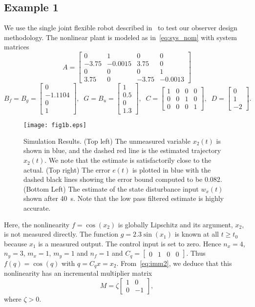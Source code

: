 \documentclass[times, doublespace]{rncauth}
\begin{document}
\subsection{Example 1}
We use the single joint flexible robot described in~\cite{Zhu2014} to test our observer design methodology. The nonlinear plant is modeled as in~\eqref{eq:sys_nom} with system matrices
\[
A = \begin{bmatrix}
0 & 1 & 0 & 0\\
-3.75 & -0.0015 & 3.75 & 0\\
0 & 0 & 0 & 1\\
3.75 & 0 & -3.75 & -0.0013
\end{bmatrix}\]
\begin{equation*} B_f = B_g = \begin{bmatrix}
0 \\ -1.1104 \\ 0 \\ 1
\end{bmatrix}, \;\; G = B_u = \begin{bmatrix}
1 \\ 0.5 \\ 0 \\ 1.3
\end{bmatrix}, \;\; C = \begin{bmatrix}
1 & 0 & 0 & 0\\
0 & 0 & 1 & 0\\
0 & 0 & 0 & 1
\end{bmatrix}, \;\; D = \begin{bmatrix}
0 \\ 1 \\ -2
\end{bmatrix}.
\end{equation*}
\begin{figure}[!ht]
	\centering
	\texttt{[image: fig1b.eps]}
	\caption{Simulation Results. (Top left) The unmeasured variable $x_2(t)$ is shown in blue, and the dashed red line is the estimated trajectory $\hat x_2(t)$. We note that the estimate is satisfactorily close to the actual. (Top right) The error $e(t)$ is plotted in blue with the dashed black lines showing the error bound computed to be 0.082. (Bottom Left) The estimate of the state disturbance input $w_x(t)$ shown after 40~s. Note that the low pass filtered estimate is highly accurate. }
	\label{fig:ex1}
\end{figure}
Here, the nonlinearity $f = \cos(x_2)$ is globally Lipschitz and its argument, $x_2$, is not measured directly. The function $g = 2.3\sin(x_1)$ is known at all $t\ge t_0$ because $x_1$ is a measured output. The control input is set to zero.
Hence $n_x = 4$, $n_y = 3$, $m_x=1$, $m_y = 1$ and $n_f=1$ and $C_q = \begin{bmatrix}
0 & 1 & 0 & 0
\end{bmatrix}$. Thus $f(q) = \cos(q)$ with $q=C_q x=x_2$. From~\eqref{eq:imm2}, we deduce that this nonlinearity has an incremental multiplier matrix $$M = \zeta \begin{bmatrix}
1 & 0\\0 & -1
\end{bmatrix},$$ where $\zeta> 0$.
\end{document}
